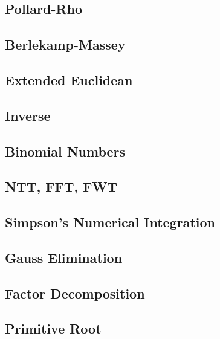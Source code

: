 \subsection{Pollard-Rho}
\raggedbottom
\hrulefill
\subsection{Berlekamp-Massey}
\raggedbottom
\hrulefill
\subsection{Extended Euclidean}
\raggedbottom
\hrulefill
\subsection{Inverse}
\raggedbottom
\hrulefill
\subsection{Binomial Numbers}
\raggedbottom
\hrulefill
\subsection{NTT, FFT, FWT}
\raggedbottom
\hrulefill
\subsection{Simpson's Numerical Integration}
\raggedbottom
\hrulefill
\subsection{Gauss Elimination}
\raggedbottom
\hrulefill
\subsection{Factor Decomposition}
\raggedbottom
\hrulefill
\subsection{Primitive Root}
\raggedbottom
\hrulefill
